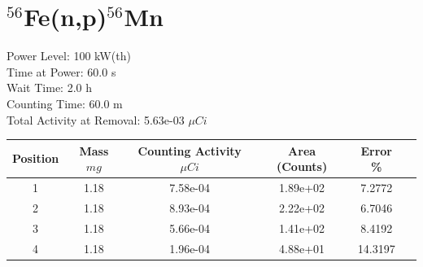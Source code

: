 \newpage

\section*{ $^{56}$Fe(n,p)$^{56}$Mn }

Power Level: 100 kW(th) \\
Time at Power: 60.0 s \\
Wait Time:  2.0 h \\
Counting Time: 60.0 m \\
Total Activity at Removal: 5.63e-03 $\mu Ci$

\begin{table}[h]
\centering
\begin{tabular}{ |c|c|c|c|c|c| }
 \hline
 Position & Mass $mg$ & Counting Activity $\mu Ci$ & Area (Counts) & Error \% \\
 \hline 
 1 & 1.18 & 7.58e-04 & 1.89e+02 & 7.2772 \\ 
\hline
 2 & 1.18 & 8.93e-04 & 2.22e+02 & 6.7046 \\ 
\hline
 3 & 1.18 & 5.66e-04 & 1.41e+02 & 8.4192 \\ 
\hline
 4 & 1.18 & 1.96e-04 & 4.88e+01 & 14.3197 \\ 
\hline
\end{tabular}
\end{table}

